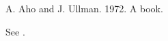 \documentclass{article}
\begin{document}
\begin{thebibliography}{}
 A. Aho and J. Ullman. 1972. A book.
\end{thebibliography}
See \cite{a}.
\end{document}
